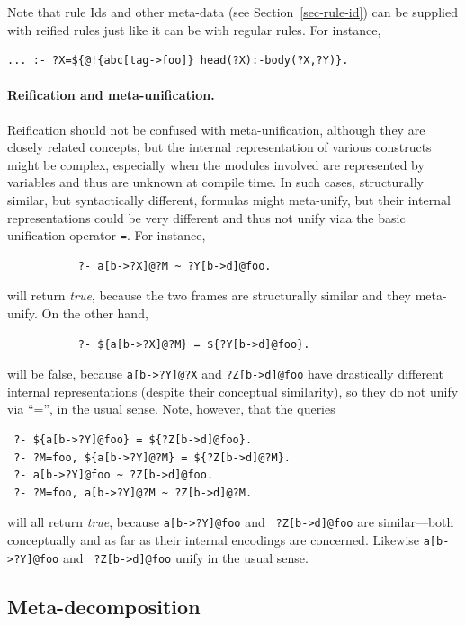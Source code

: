 \documentclass[11pt]{article}
\begin{document}
Note that rule Ids and other meta-data (see
Section~\ref{sec-rule-id}) can be supplied with reified rules just like it
can be with regular rules. For instance,
\begin{verbatim}
... :- ?X=${@!{abc[tag->foo]} head(?X):-body(?X,?Y)}.
\end{verbatim}

\paragraph{Reification and meta-unification.}
Reification should not be confused with meta-unification, although they are
closely related concepts, but the internal representation of various
constructs might be complex, especially when the modules involved are
represented by variables and thus are unknown at compile time.
In such cases,
structurally similar, but syntactically different, formulas
might meta-unify, but their internal representations could be very
different and thus not unify viaa the basic unification operator
\texttt{=}.
For instance, 
\begin{verbatim}
           ?- a[b->?X]@?M ~ ?Y[b->d]@foo.
\end{verbatim}
will return \emph{true}, because the two frames are structurally similar
and they meta-unify. On the other hand,
\begin{verbatim}
           ?- ${a[b->?X]@?M} = ${?Y[b->d]@foo}.
\end{verbatim}
will be false, because {\tt a[b->?Y]@?X} and {\tt ?Z[b->d]@foo} have
drastically different
internal representations (despite their conceptual 
similarity), so they do not unify via ``='',  in the usual
sense. Note, however, that the queries
\begin{verbatim}
 ?- ${a[b->?Y]@foo} = ${?Z[b->d]@foo}.
 ?- ?M=foo, ${a[b->?Y]@?M} = ${?Z[b->d]@?M}.
 ?- a[b->?Y]@foo ~ ?Z[b->d]@foo.
 ?- ?M=foo, a[b->?Y]@?M ~ ?Z[b->d]@?M.
\end{verbatim}
will all return \emph{true}, because {\tt a[b->?Y]@foo} and {\tt
  ?Z[b->d]@foo} are similar---both conceptually and as far as
  their
internal encodings are concerned. Likewise {\tt a[b->?Y]@foo} and {\tt
  ?Z[b->d]@foo} unify in the usual sense.

\subsection{Meta-decomposition}\label{sec-meta-decomp}
\end{document}
